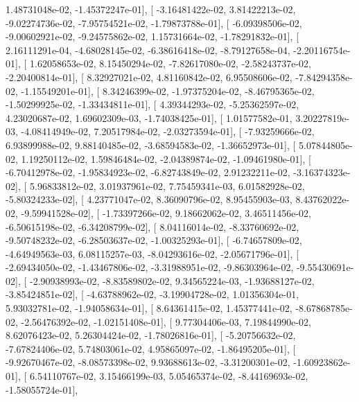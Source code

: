 \documentclass{article}
\begin{document}
          1.48731048e-02,  -1.45372247e-01],
       [ -3.16481422e-02,   3.81422213e-02,  -9.02274736e-02,
         -7.95754521e-02,  -1.79873788e-01],
       [ -6.09398506e-02,  -9.00602921e-02,  -9.24575862e-02,
          1.15731664e-02,  -1.78291832e-01],
       [  2.16111291e-04,  -4.68028145e-02,  -6.38616418e-02,
         -8.79127658e-04,  -2.20116754e-01],
       [  1.62058653e-02,   8.15450294e-02,  -7.82617080e-02,
         -2.58243737e-02,  -2.20400814e-01],
       [  8.32927021e-02,   4.81160842e-02,   6.95508606e-02,
         -7.84294358e-02,  -1.15549201e-01],
       [  8.34246399e-02,  -1.97375204e-02,  -8.46795365e-02,
         -1.50299925e-02,  -1.33434811e-01],
       [  4.39344293e-02,  -5.25362597e-02,   4.23020687e-02,
          1.69602309e-03,  -1.74038425e-01],
       [  1.01577582e-01,   3.20227819e-03,  -4.08414949e-02,
          7.20517984e-02,  -2.03273594e-01],
       [ -7.93259666e-02,   6.93899988e-02,   9.88140485e-02,
         -3.68594583e-02,  -1.36652973e-01],
       [  5.07844805e-02,   1.19250112e-02,   1.59846484e-02,
         -2.04389874e-02,  -1.09461980e-01],
       [ -6.70412978e-02,  -1.95834923e-02,  -6.82743849e-02,
          2.91232211e-02,  -3.16374323e-02],
       [  5.96833812e-02,   3.01937961e-02,   7.75459341e-03,
          6.01582928e-02,  -5.80324233e-02],
       [  4.23771047e-02,   8.36090796e-02,   8.95455903e-03,
          8.43762022e-02,  -9.59941528e-02],
       [ -1.73397266e-02,   9.18662062e-02,   3.46511456e-02,
         -6.50615198e-02,  -6.34208799e-02],
       [  8.04116014e-02,  -8.33760692e-02,  -9.50748232e-02,
         -6.28503637e-02,  -1.00325293e-01],
       [ -6.74657809e-02,  -4.64949563e-03,   6.08115257e-03,
         -8.04293616e-02,  -2.05671796e-01],
       [ -2.69434050e-02,  -1.43467806e-02,  -3.31988951e-02,
         -9.86303964e-02,  -9.55430691e-02],
       [ -2.90938993e-02,  -8.83589802e-02,   9.34565224e-03,
         -1.93688127e-02,  -3.85424851e-02],
       [ -4.63788962e-02,  -3.19904728e-02,   1.01356304e-01,
          5.93032781e-02,  -1.94058634e-01],
       [  8.64361415e-02,   1.45377441e-02,  -8.67868785e-02,
         -2.56476392e-02,  -1.02151408e-01],
       [  9.77304406e-03,   7.19844990e-02,   8.62076423e-02,
          5.26304424e-02,  -1.78026816e-01],
       [ -5.20756632e-02,  -7.67824406e-02,   5.74803061e-02,
          4.95865097e-02,  -1.86495205e-01],
       [ -9.92670467e-02,  -8.08573398e-02,   9.93688613e-02,
         -3.31200301e-02,  -1.60923862e-01],
       [  6.54110767e-02,   3.15466199e-03,   5.05465374e-02,
         -8.44169693e-02,  -1.58055724e-01],
\end{document}
